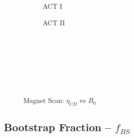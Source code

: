 \begin{figure*}[h!]
\begin{subfigure}[t]{0.45\textwidth}
\begin{adjustbox}{width=\textwidth}
      \Large
      
    \end{adjustbox}
        \caption{ACT I}
    \end{subfigure}
    \hfill
    \begin{subfigure}[t]{0.45\textwidth}
        \centering
    \begin{adjustbox}{width=\textwidth}
      \Large
      
    \end{adjustbox}
        \caption{ACT II}
    \end{subfigure}
    \hfill \hfill ~\\ ~\\ ~\\ ~\\
  \caption[]{Magnet Scan: $\eta_{CD}$ vs $B_0$} ~\\
\end{figure*}


\clearpage

\newpage

\subsection*{ Bootstrap Fraction  -- $f_{BS}$ }
  \label{subsection:scan_f_BS}

